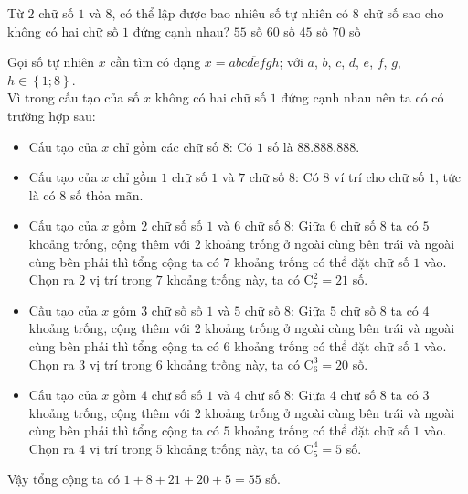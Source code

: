 \begin{ex}%
Từ $2$ chữ số $1$ và $8$, có thể lập được bao nhiêu số tự nhiên có $8$ chữ số sao cho không có hai chữ số $1$ đứng cạnh nhau?
\choice
{\True $55$ số}
{$60$ số}
{$45$ số}
{$70$ số}
\loigiai
{
Gọi số tự nhiên $x$ cần tìm có dạng $x=\overline{abcdefgh}$; với $a$, $b$, $c$, $d$, $e$, $f$, $g$, $h\in\left\{1;8\right\}$.\\
Vì trong cấu tạo của số $x$ không có hai chữ số $1$ đứng cạnh nhau nên ta có có trường hợp sau:
\begin{itemize}
\item Cấu tạo của $x$ chỉ gồm các chữ số $8$: Có $1$ số là $88.888.888$.
\item Cấu tạo của $x$ chỉ gồm $1$ chữ số $1$ và $7$ chữ số $8$: Có $8$ ví trí cho chữ số $1$, tức là có $8$ số thỏa mãn.
\item Cấu tạo của $x$ gồm $2$ chữ số số $1$ và $6$ chữ số $8$: Giữa $6$ chữ số $8$ ta có $5$ khoảng trống, cộng thêm với $2$ khoảng trống ở ngoài cùng bên trái và ngoài cùng bên phải thì tổng cộng ta có $7$ khoảng trống có thể đặt chữ số $1$ vào. Chọn ra $2$ vị trí trong $7$ khoảng trống này, ta có $\mathrm{C}_7^2 = 21$ số.
\item Cấu tạo của $x$ gồm $3$ chữ số số $1$ và $5$ chữ số $8$: Giữa $5$ chữ số $8$ ta có $4$ khoảng trống, cộng thêm với $2$ khoảng trống ở ngoài cùng bên trái và ngoài cùng bên phải thì tổng cộng ta có $6$ khoảng trống có thể đặt chữ số $1$ vào. Chọn ra $3$ vị trí trong $6$ khoảng trống này, ta có $\mathrm{C}_6^3 = 20$ số.
\item Cấu tạo của $x$ gồm $4$ chữ số số $1$ và $4$ chữ số $8$: Giữa $4$ chữ số $8$ ta có $3$ khoảng trống, cộng thêm với $2$ khoảng trống ở ngoài cùng bên trái và ngoài cùng bên phải thì tổng cộng ta có $5$ khoảng trống có thể đặt chữ số $1$ vào. Chọn ra $4$ vị trí trong $5$ khoảng trống này, ta có $\mathrm{C}_5^4 = 5$ số.
\end{itemize}
Vậy tổng cộng ta có $1+8+21+20+5 = 55$ số.
}
\end{ex}

